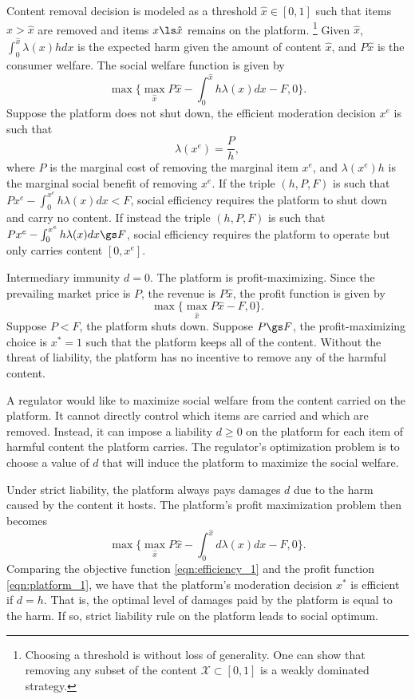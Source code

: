 Content removal decision is modeled as a threshold $\hat{x}\in[0,1]$ such that items $x>\hat{x}$ are removed and items $x\ls\hat{x}$ remains on the platform. 
\footnote{Choosing a threshold is without loss of generality. One can show that removing any subset of the content $\mathcal{X}\subset[0,1]$ is a weakly dominated strategy.}
Given $\hat{x}$, $\int_0^{\hat{x}}\lambda(x)hdx$ is the expected harm given the amount of content $\hat{x}$, and $P\hat{x}$ is the consumer welfare.
The social welfare function is given by 
\begin{equation}\label{eqn:efficiency_1}
    \max\{\max_{\hat{x}}P\hat{x} - \int_0^{\hat{x}}h\lambda(x)dx-F, 0\}.
\end{equation}
Suppose the platform does not shut down, 
the efficient moderation decision $x^e$ is such that
\begin{equation}
    \lambda(x^e)=\frac{P}{h},
\end{equation}
where $P$ is the marginal cost of removing the marginal item $x^e$, and $\lambda(x^e)h$ is the marginal social benefit of removing $x^e$. 
If the triple $(h,P,F)$ is such that $Px^e - \int_0^{x^e}h\lambda(x)dx < F$, social efficiency requires the platform to shut down and carry no content. If instead the triple $(h,P,F)$ is such that $Px^e - \int_0^{x^e}h\lambda(x)dx \gs F$, social efficiency requires the platform to operate but only carries content $[0,x^e]$.

Intermediary immunity $d=0$.
The platform is profit-maximizing. Since the prevailing market price is $P$, the revenue is $P\hat{x}$, the profit function is given by 
\begin{equation}
    \max\{\max_{\hat{x}}P\hat{x}-F,0\}.
\end{equation}
Suppose $P<F$, the platform shuts down. Suppose $P\gs F$, the profit-maximizing choice is $x^{\ast}=1$ such that the platform keeps all of the content. Without the threat of liability, the platform has no incentive to remove any of the harmful content. 


A regulator would like to maximize social welfare from the content carried on the platform. It cannot directly control which items are carried and which are removed. Instead, it can impose a liability $d\ge 0$ on the platform for each item of harmful content the platform carries. The regulator's optimization problem is to choose a value of $d$ that will induce the platform to maximize the social welfare.

Under strict liability, the platform always pays damages $d$ due to the harm caused by the content it hosts. 
The platform's profit maximization problem then becomes
\begin{equation}\label{eqn:platform_1}
    \max\{\max_{\hat{x}}P\hat{x} - \int_0^{\hat{x}}d\lambda(x)dx-F, 0\}.
\end{equation}
Comparing the objective function \ref{eqn:efficiency_1} and the profit function \ref{eqn:platform_1}, we have that the platform's moderation decision $x^{\ast}$ is efficient if $d=h$. 
That is, the optimal level of damages paid by the platform is equal to the harm.
If so, strict liability rule on the platform leads to social optimum. 

